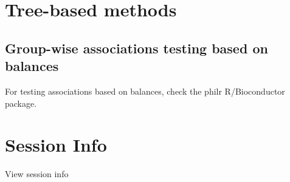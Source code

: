 \documentclass[
]{book}
\begin{document}
\hypertarget{tree-based-methods}{%
\section{Tree-based methods}\label{tree-based-methods}}

\hypertarget{group-wise-associations-testing-based-on-balances}{%
\subsection{Group-wise associations testing based on balances}\label{group-wise-associations-testing-based-on-balances}}

For testing associations based on balances, check the philr R/Bioconductor package.

\hypertarget{session-info-7}{%
\section*{Session Info}\label{session-info-7}}

View session info
\end{document}
